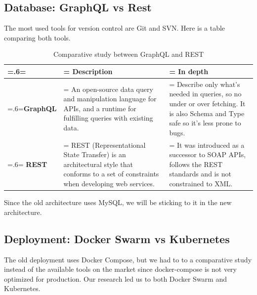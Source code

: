 \subsection{Database: GraphQL vs Rest}
The most used tools for version control are Git and SVN. Here is a table comparing both tools.
\begin{table}[H]
    \renewcommand{\arraystretch}{1.5}%
    \caption{Comparative study between GraphQL and REST \cite{graphql-vs-rest}}
    \centering
    \medskip
    \begin{tabularx}{1\textwidth} {
            | >{\hsize=.6\hsize\linewidth=\hsize\centering\arraybackslash}X
            | >{\hsize=1.2\hsize\linewidth=\hsize\justifying\arraybackslash}X
            | >{\hsize=1.2\hsize\linewidth=\hsize\justifying\arraybackslash}X |}
        \hline
        \rowcolor{primary} & \textbf {Description}                                                                                                                          & \textbf {In depth}                                                                                                                          \\
        \hline
        \textbf{GraphQL}   & \noindent An open-source data query and manipulation language for APIs, and a runtime for fulfilling queries with existing data.               & \noindent Describe only what's needed in queries, so no under or over fetching. It is also Schema and Type safe so it's less prone to bugs. \\
        \hline\noindent
        \textbf{REST}      & \noindent REST (Representational State Transfer) is an architectural style that conforms to a set of constraints when developing web services. & \noindent It was introduced as a successor to SOAP APIs, follows the REST standards and is not constrained to XML.                          \\
        \hline
    \end{tabularx}
\end{table}
Since the old architecture uses MySQL, we will be sticking to it in the new architecture.

\subsection{Deployment: Docker Swarm vs Kubernetes}
The old deployment uses Docker Compose, but we had to to a comparative study instead of the available tools on the market since docker-compose is not very optimized for production.
Our research led us to both Docker Swarm and Kubernetes.

